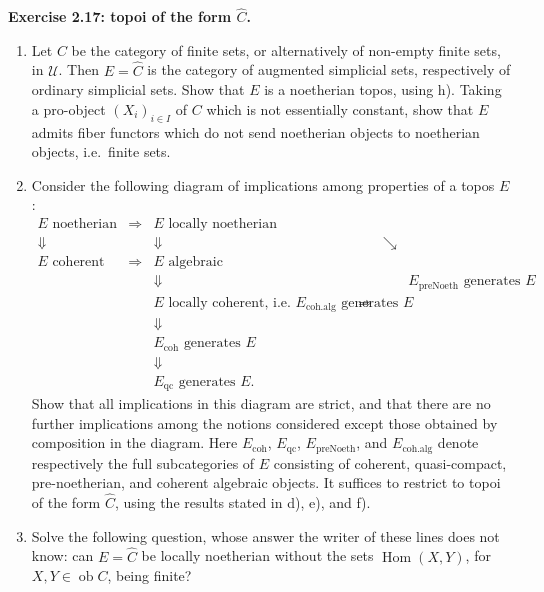 \documentclass[11pt]{article}
\newcommand{\U}{\mathcal{U}}
\newcommand{\Hom}{\operatorname{Hom}}
\newcommand{\ob}{\operatorname{ob}}
\newcommand{\qc}{\mathrm{qc}}
\newcommand{\coh}{\mathrm{coh}}
\newcommand{\preNoeth}{\mathrm{preNoeth}}
\newcommand{\cohalg}{\mathrm{coh.alg}}
\newcommand{\ie}{i.e.\ }
\newenvironment{remarktext}[1]{\par\medskip\noindent\textbf{#1.}\ }{\par\medskip}
\begin{document}
\begin{remarktext}{Exercise 2.17: topoi of the form \(\widehat C\)}
\begin{enumerate}[label=\alph*)]
\item Let \(C\) be the category of finite sets, or alternatively of non-empty finite sets, in \(\U\). Then \(E=\widehat C\) is the category of augmented simplicial sets, respectively of ordinary simplicial sets. Show that \(E\) is a noetherian topos, using h). Taking a pro-object \((X_i)_{i\in I}\) of \(C\) which is not essentially constant, show that \(E\) admits fiber functors which do not send noetherian objects to noetherian objects, \ie finite sets.
\item Consider the following diagram of implications among properties of a topos \(E\):
\[
\begin{array}{cccccc}
E\text{ noetherian} & \Rightarrow & E\text{ locally noetherian} &&&\\
\Downarrow && \Downarrow && \searrow &\\
E\text{ coherent} & \Rightarrow & E\text{ algebraic} &&&\\
&& \Downarrow &&& E_{\preNoeth}\text{ generates }E\\
&& E\text{ locally coherent, i.e. }E_{\cohalg}\text{ generates }E & \Rightarrow &&\\
&& \Downarrow &&&\\
&& E_{\coh}\text{ generates }E &&&\\
&& \Downarrow &&&\\
&& E_{\qc}\text{ generates }E.&&&
\end{array}
\]
Show that all implications in this diagram are strict, and that there are no further implications among the notions considered except those obtained by composition in the diagram. Here \(E_{\coh}\), \(E_{\qc}\), \(E_{\preNoeth}\), and \(E_{\cohalg}\) denote respectively the full subcategories of \(E\) consisting of coherent, quasi-compact, pre-noetherian, and coherent algebraic objects. It suffices to restrict to topoi of the form \(\widehat C\), using the results stated in d), e), and f).
\item Solve the following question, whose answer the writer of these lines does not know: can \(E=\widehat C\) be locally noetherian without the sets \(\Hom(X,Y)\), for \(X,Y\in\ob C\), being finite?
\end{enumerate}
\end{remarktext}
\end{document}
